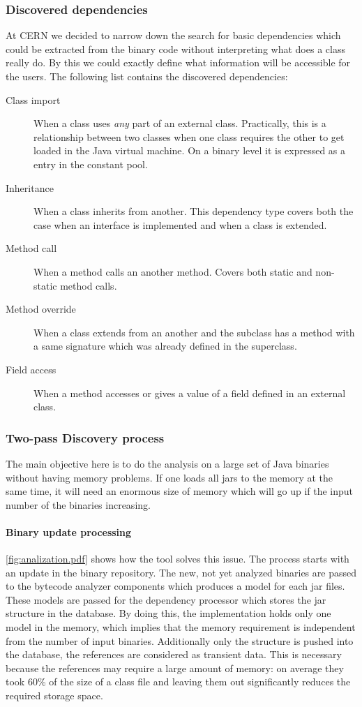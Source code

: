 \subsubsection{Discovered dependencies}
At CERN we decided to narrow down the search for basic
dependencies which could be extracted from the binary code without interpreting
what does a class really do. By this we could exactly define what information
will be accessible for the users. The following list contains the discovered
dependencies:
\begin{description}
\item[Class import] When a class uses \emph{any} part of an external class. 
Practically, this is a relationship between two classes when one class requires
the other to get loaded in the Java virtual machine. On a binary level it is 
expressed as a  entry in the constant pool.  
\item[Inheritance] When a class inherits from another. This dependency type 
covers both the case when an interface is implemented and when a class is 
extended. 
\item[Method call] When a method calls an another method. Covers both static 
and non-static method calls.
\item[Method override] When a class extends from an another and the subclass 
has a method with a same signature which was already defined in the superclass.  
\item[Field access] When a method accesses or gives a value of a field defined 
in an external class.
\end{description}


\subsubsection{Two-pass Discovery process}
The main objective here is to do the analysis on a large set of Java binaries
without having memory problems. If one loads all jars to the memory at the same
time, it will need an enormous size of memory which will go up if the input
number of the binaries increasing.


\paragraph{Binary update processing}
\autoref{fig:analization.pdf} shows how the tool solves this issue. The process
starts with an update in the binary repository. The new, not yet analyzed
binaries are passed to the bytecode analyzer components which produces a model
for each jar files. These models are passed for the dependency processor which
stores the jar structure in the database. By doing this, the implementation
holds only one model in the memory, which implies that the memory requirement is
independent from the number of input binaries. Additionally only the structure
is pushed into the database, the references are considered as transient data.
This is necessary because the references may require a large amount of memory:
on average they took 60\% of the size of a class file and leaving them out
significantly reduces the required storage space.

